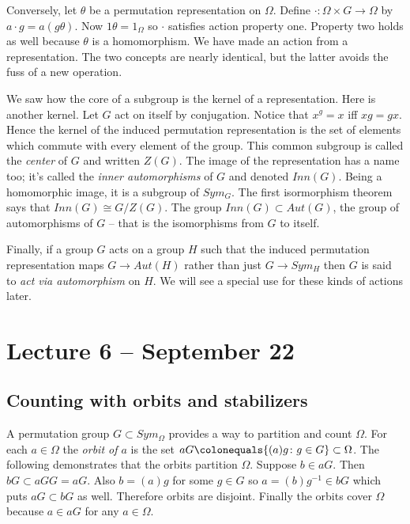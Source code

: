 \documentclass[letterpaper]{article}
\begin{document}
Conversely, let $\theta$ be a permutation representation on $\Omega$.
Define $\cdot \colon \Omega \times G \rightarrow \Omega$ by $a \cdot
g = a(g\theta)$. Now $1\theta = 1_\Omega$ so $\cdot$ satisfies
action property one. Property two holds as well because $\theta$
is a homomorphism. We have made an action from a representation.
The two concepts are nearly identical, but the latter avoids the
fuss of a new operation.

We saw how the core of a subgroup is the kernel of a representation.
Here is another kernel. Let $G$ act on itself by conjugation. Notice
that $x^g = x$ iff $xg = gx$. Hence the kernel of the induced
permutation representation is the set of elements which commute
with every element of the group. This common subgroup is called the
\emph{center} of $G$ and written $Z(G)$. The image of the representation
has a name too; it's called the \emph{inner automorphisms} of $G$
and denoted $Inn(G)$. Being a homomorphic image, it is a subgroup
of $Sym_G$. The first isormorphism theorem says that $Inn(G) \cong
G/Z(G)$. The group $Inn(G) \subset Aut(G)$, the group of automorphisms
of $G$ -- that is the isomorphisms from $G$ to itself.

Finally, if a group $G$ acts on a group $H$ such that the induced
permutation representation maps $G \rightarrow Aut(H)$ rather than
just $G \rightarrow Sym_H$ then $G$ is said to \emph{act via
automorphism} on $H$. We will see a special use for these kinds of
actions later.

\section{Lecture 6 -- September 22}

\subsection{Counting with orbits and stabilizers}

A permutation group $G \subset Sym_\Omega$ provides a way to partition
and count  $\Omega$. For each $a \in \Omega$ the \emph{orbit of
$a$} is the set $aG \colonequals \{(a)g\colon g \in G\} \subset
\Omega$. The following demonstrates that the orbits partition
$\Omega$. Suppose $b \in aG$. Then $bG \subset aGG = aG$. Also $b
= (a)g$ for some $g \in G$ so $a = (b)g^{-1} \in bG$ which puts $aG
\subset bG$ as well. Therefore orbits are disjoint. Finally the
orbits cover $\Omega$ because $a \in aG$ for any $a \in \Omega$.
\end{document}
